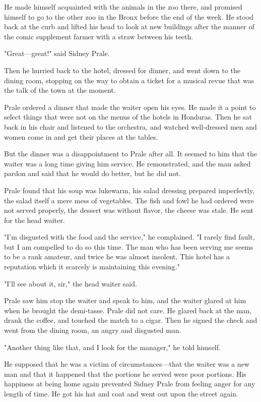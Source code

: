 \documentclass{novel}
\begin{document}
He made himself acquainted with the animals in the zoo there, and promised himself to go to the other zoo in the Bronx before the end of the week. He stood back at the curb and lifted his head to look at new buildings after the manner of the comic supplement farmer with a straw between his teeth.

"Great---great!" said Sidney Prale.

Then he hurried back to the hotel, dressed for dinner, and went down to the dining room, stopping on the way to obtain a ticket for a musical revue that was the talk of the town at the moment.

Prale ordered a dinner that made the waiter open his eyes. He made it a point to select things that were not on the menus of the hotels in Honduras. Then he sat back in his chair and listened to the orchestra, and watched well-dressed men and women come in and get their places at the tables.

But the dinner was a disappointment to Prale after all. It seemed to him that the waiter was a long time giving him service. He remonstrated, and the man asked pardon and said that he would do better, but he did not.

Prale found that his soup was lukewarm, his salad dressing prepared imperfectly, the salad itself a mere mess of vegetables. The fish and fowl he had ordered were not served properly, the dessert was without flavor, the cheese was stale. He sent for the head waiter.

"I'm disgusted with the food and the service," he complained. "I rarely find fault, but I am compelled to do so this time. The man who has been serving me seems to be a rank amateur, and twice he was almost insolent. This hotel has a reputation which it scarcely is maintaining this evening."

"I'll see about it, sir," the head waiter said.

Prale saw him stop the waiter and speak to him, and the waiter glared at him when he brought the demi-tasse. Prale did not care. He glared back at the man, drank the coffee, and touched the match to a cigar. Then he signed the check and went from the dining room, an angry and disgusted man.

"Another thing like that, and I look for the manager," he told himself.

He supposed that he was a victim of circumstances---that the waiter was a new man and that it happened that the portions he served were poor portions. His happiness at being home again prevented Sidney Prale from feeling anger for any length of time. He got his hat and coat and went out upon the street again.
\end{document}
